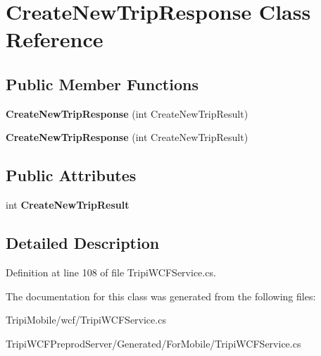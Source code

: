 \hypertarget{class_create_new_trip_response}{
\section{CreateNewTripResponse Class Reference}
\label{class_create_new_trip_response}
}
\subsection*{Public Member Functions}
\begin{DoxyCompactItemize}
\item 
\hypertarget{class_create_new_trip_response_ace87eddf2541a07b121b353edf5cafc3}{
{\bfseries CreateNewTripResponse} (int CreateNewTripResult)}
\label{class_create_new_trip_response_ace87eddf2541a07b121b353edf5cafc3}

\item 
\hypertarget{class_create_new_trip_response_ace87eddf2541a07b121b353edf5cafc3}{
{\bfseries CreateNewTripResponse} (int CreateNewTripResult)}
\label{class_create_new_trip_response_ace87eddf2541a07b121b353edf5cafc3}

\end{DoxyCompactItemize}
\subsection*{Public Attributes}
\begin{DoxyCompactItemize}
\item 
\hypertarget{class_create_new_trip_response_af30cb1c0c113c74a2ec9ae3abc4d0d5d}{
int {\bfseries CreateNewTripResult}}
\label{class_create_new_trip_response_af30cb1c0c113c74a2ec9ae3abc4d0d5d}

\end{DoxyCompactItemize}


\subsection{Detailed Description}


Definition at line 108 of file TripiWCFService.cs.

The documentation for this class was generated from the following files:\begin{DoxyCompactItemize}
\item 
TripiMobile/wcf/TripiWCFService.cs\item 
TripiWCFPreprodServer/Generated/ForMobile/TripiWCFService.cs\end{DoxyCompactItemize}
